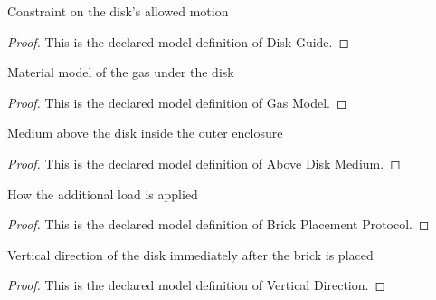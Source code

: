 \begin{definition}
  \label{def:physics:phyx-mini-0333:phyxminiproblems-problemphyxmini0333-diskguide}
  Constraint on the disk's allowed motion
\end{definition}
\begin{proof}
  This is the declared model definition of Disk Guide.
\end{proof}
\begin{definition}
  \label{def:physics:phyx-mini-0333:phyxminiproblems-problemphyxmini0333-gasmodel}
  Material model of the gas under the disk
\end{definition}
\begin{proof}
  This is the declared model definition of Gas Model.
\end{proof}
\begin{definition}
  \label{def:physics:phyx-mini-0333:phyxminiproblems-problemphyxmini0333-abovediskmedium}
  Medium above the disk inside the outer enclosure
\end{definition}
\begin{proof}
  This is the declared model definition of Above Disk Medium.
\end{proof}
\begin{definition}
  \label{def:physics:phyx-mini-0333:phyxminiproblems-problemphyxmini0333-brickplacementprotocol}
  How the additional load is applied
\end{definition}
\begin{proof}
  This is the declared model definition of Brick Placement Protocol.
\end{proof}
\begin{definition}
  \label{def:physics:phyx-mini-0333:phyxminiproblems-problemphyxmini0333-verticaldirection}
  Vertical direction of the disk immediately after the brick is placed
\end{definition}
\begin{proof}
  This is the declared model definition of Vertical Direction.
\end{proof}
